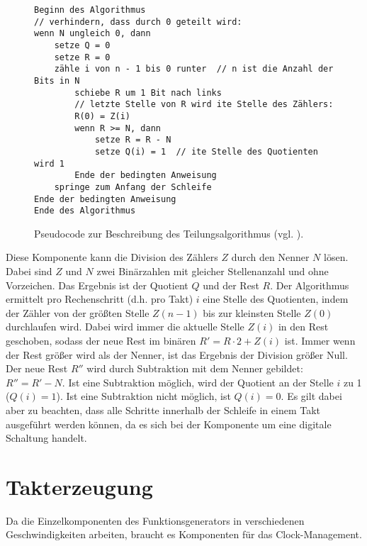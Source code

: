 \begin{figure}[h]
\begin{verbatim}
Beginn des Algorithmus
// verhindern, dass durch 0 geteilt wird:
wenn N ungleich 0, dann
    setze Q = 0
    setze R = 0
    zähle i von n - 1 bis 0 runter  // n ist die Anzahl der Bits in N
        schiebe R um 1 Bit nach links
        // letzte Stelle von R wird ite Stelle des Zählers:
        R(0) = Z(i)                    
        wenn R >= N, dann               
            setze R = R - N
            setze Q(i) = 1  // ite Stelle des Quotienten wird 1 
        Ende der bedingten Anweisung
    springe zum Anfang der Schleife
Ende der bedingten Anweisung
Ende des Algorithmus
\end{verbatim}
  \caption{Pseudocode zur Beschreibung des Teilungsalgorithmus (vgl. \cite{wikipedia2022}).} \label{Comp:Arith:Division:Pseudo}
\end{figure}

Diese Komponente kann die Division des Zählers $Z$ durch den Nenner $N$ lösen.
Dabei sind $Z$ und $N$ zwei Binärzahlen mit gleicher Stellenanzahl und ohne Vorzeichen.
Das Ergebnis ist der Quotient $Q$ und der Rest $R$.
Der Algorithmus ermittelt pro Rechenschritt (d.h. pro Takt) $i$ eine Stelle des Quotienten, indem der Zähler von der größten Stelle $Z(n-1)$ bis zur kleinsten Stelle $Z(0)$ durchlaufen wird.
Dabei wird immer die aktuelle Stelle $Z(i)$ in den Rest geschoben, sodass der neue Rest im binären $R' = R \cdot 2 + Z(i)$ ist.
Immer wenn der Rest größer wird als der Nenner, ist das Ergebnis der Division größer Null.
Der neue Rest $R''$ wird durch Subtraktion mit dem Nenner gebildet: $R'' = R' - N$.
Ist eine Subtraktion möglich, wird der Quotient an der Stelle $i$ zu 1 ($Q(i)=1$).
Ist eine Subtraktion nicht möglich, ist $Q(i)=0$.
Es gilt dabei aber zu beachten, dass alle Schritte innerhalb der Schleife in einem Takt ausgeführt werden können, da es sich bei der Komponente um eine digitale Schaltung handelt.

\section{Takterzeugung}
Da die Einzelkomponenten des Funktionsgenerators in verschiedenen Geschwindigkeiten arbeiten, braucht es Komponenten für das Clock-Management. 


